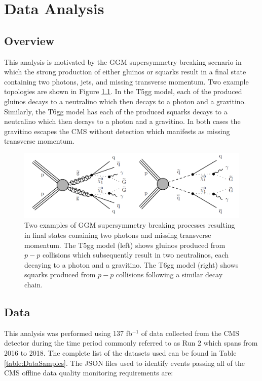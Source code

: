 \chapter{Data Analysis}

\section{Overview}



This analysis is motivated by the GGM supersymmetry breaking scenario in which the strong production of either gluinos or squarks result in a final state containing two photons, jets, and missing transverse momentum.  Two example topologies are shown in Figure \ref{fig:susysignals}.  In the T5gg model, each of the produced gluinos decays to a neutralino which then decays to a photon and a gravitino.  Similarly, the T6gg model has each of the produced squarks decays to a neutralino which then decays to a photon and a gravitino.  In both cases the gravitino escapes the CMS without detection which manifests as missing transverse momentum.  

\begin{figure}[h]
	\centering
	\includegraphics[width=0.9\linewidth]{Figures/SUSYsignals}
	\caption{Two examples of GGM supersymmetry breaking processes resulting in final states conaining two photons and missing transverse momentum. The T5gg model (left) shows gluinos produced from $p-p$ collisions which subsequently result in two neutralinos, each decaying to a photon and a gravitino. The T6gg model (right) shows squarks produced from $p-p$ collisions following a similar decay chain.}
	\label{fig:susysignals}
\end{figure}


\section{Data}
This analysis was performed using 137 fb$^{-1}$ of data collected from the CMS detector during the time period commonly referred to as Run 2 which spans from  2016 to 2018.  The complete list of the datasets used can be found in Table \ref{table:DataSamples}.  The JSON files used to identify events passing all of the CMS offline data quality monitoring requirements are:

